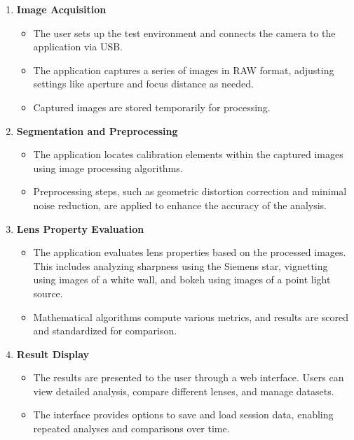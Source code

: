 \begin{enumerate}
    \item \textbf{Image Acquisition}
    \begin{itemize}
        \item The user sets up the test environment and connects the camera to the application via USB.
        \item The application captures a series of images in RAW format, adjusting settings like aperture and focus distance as needed.
        \item Captured images are stored temporarily for processing.
    \end{itemize}

    \item \textbf{Segmentation and Preprocessing}
    \begin{itemize}
        \item The application locates calibration elements within the captured images using image processing algorithms.
        \item Preprocessing steps, such as geometric distortion correction and minimal noise reduction, are applied to enhance the accuracy of the analysis.
    \end{itemize}

    \item \textbf{Lens Property Evaluation}
    \begin{itemize}
        \item The application evaluates lens properties based on the processed images. This includes analyzing sharpness using the Siemens star, vignetting using images of a white wall, and bokeh using images of a point light source.
        \item Mathematical algorithms compute various metrics, and results are scored and standardized for comparison.
    \end{itemize}

    \item \textbf{Result Display}
    \begin{itemize}
        \item The results are presented to the user through a web interface. Users can view detailed analysis, compare different lenses, and manage datasets.
        \item The interface provides options to save and load session data, enabling repeated analyses and comparisons over time.
    \end{itemize}
\end{enumerate}

